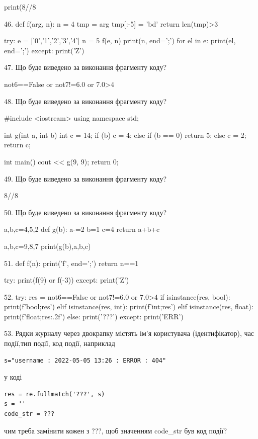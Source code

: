 \documentclass[11pt]{article}
\begin{document}
print(8//8%


46. 
def f(arg, n):
    n = 4
    tmp = arg
    tmp[:-5] = 'bd'
    return len(tmp)>3

try:
    e = ['0','1','2','3','4']
    n = 5
    f(e, n)
    print(n, end=';')
    for el in e:
        print(el, end=';')
except:
    print('Z')


47. Що буде виведено за виконання фрагменту коду?

not6==False or not7!=6.0 or 7.0>4


48. Що буде виведено за виконання фрагменту коду?

#include <iostream>
using namespace std;

int g(int a, int b){
    int c = 14;
    if (b)
        c = 4;
    else if (b == 0)
         return 5;
    else 
        c = 2;
    return c;
}

int main(){
    cout << g(9, 9);
    return 0;
}


49. Що буде виведено за виконання фрагменту коду?

8//8%


50. Що буде виведено за виконання фрагменту коду?

a,b,c=4,5,2
def g(b):
    a-=2
    b=1
    c=4
    return a+b+c

a,b,c=9,8,7
print(g(b),a,b,c)


51. 
def f(n):
    print('f', end=';')
    return n==1

try:
    print(f(9) or f(-3))
except:
    print('Z')


52. 
try:
    res = not6==False or not7!=6.0 or 7.0>4
    if isinstance(res, bool):
        print(f'bool;{res}')
    elif isinstance(res, int):
        print(f'int;{res}')
    elif isinstance(res, float):
        print(f'float;{res:.2f}')
    else:
        print('???')
except:
    print('ERR')


53. 
Рядки журналу через двокрапку містять ім'я користувача (ідентифікатор), час події,тип події, код події, наприклад
\begin{verbatim}
s="username : 2022-05-05 13:26 : ERROR : 404"
\end{verbatim}
у коді 
\begin{verbatim}
res = re.fullmatch('???', s) 
s = ''
code_str = ??? 
\end{verbatim}
чим треба замінити кожен з ???, щоб значенням code\_str був код події? 
\end{document}
